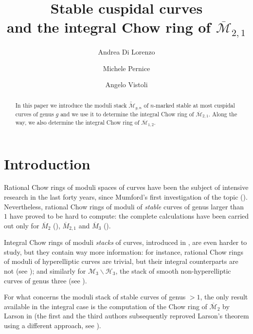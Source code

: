 \documentclass[a4paper, 10pt]{amsart}
\numberwithin{equation}{section}
\numberwithin{subsection}{section}
\theoremstyle{definition}
\theoremstyle{remark}
\renewcommand{\mathcal}{\mathscr}
\newcommand\cM{\mathcal{M}} \newcommand\cN{\mathcal{N}}
\newcommand{\Mbar}{\overline{\cM}}
\newcommand{\Mtilde}{\widetilde{\mathcal M}}
\begin{document}
	
	\title[Stable cuspidal curves and $\Mbar_{2,1}$]{Stable cuspidal curves \\ and the integral Chow ring of $\Mbar_{2,1}$}
	\author[A. Di Lorenzo]{Andrea Di Lorenzo}
	\address[A. Di Lorenzo]{Humboldt Universit\"{a}t zu Berlin, Germany}
	\author[M. Pernice]{Michele Pernice}
	\address[M. Pernice]{Scuola Normale Superiore, Pisa, Italy}
	\author[A. Vistoli]{Angelo Vistoli}
	\address[A. Vistoli]{Scuola Normale Superiore, Pisa, Italy}
	\maketitle
	\begin{abstract}
		In this paper we introduce the moduli stack $\Mtilde_{g,n}$ of $n$-marked stable at most cuspidal curves of genus $g$ and we use it to determine the integral Chow ring of $\Mbar_{2,1}$. Along the way, we also determine the integral Chow ring of $\Mbar_{1,2}$.
	\end{abstract}
	\section*{Introduction}\label{sec:intro}
	Rational Chow rings of moduli spaces of curves have been the subject of intensive research in the last forty years, since Mumford's first investigation of the topic (\cite{Mum}). Nevertheless, rational Chow rings of moduli of \emph{stable} curves of genus larger than $1$ have proved to be hard to compute: the complete calculations have been carried out only for $\overline{M}_2$ (\cite{Mum}), $\overline{M}_{2,1}$ and $\overline{M}_3$ (\cites{Fab,Fab1}).
	
	Integral Chow rings of moduli \emph{stacks} of curves, introduced in \cite{EG}, are even harder to study, but they contain way more information: for instance, rational Chow rings of moduli of hyperelliptic curves are trivial, but their integral counterparts are not (see \cites{VisM2,EF,Dil,Per}); and similarly for $\mathcal{M}_3\smallsetminus\mathcal{H}_3$, the stack of smooth non-hyperelliptic curves of genus three (see \cite{DLFV}).
	
	For what concerns the moduli stack of stable curves of genus $>1$, the only result available in the integral case is the computation of the Chow ring of $\Mbar_2$ by Larson in \cite{Lars} (the first and the third authors subsequently reproved Larson's theorem using a different approach, see \cite{DLV}).
	
\end{document}
